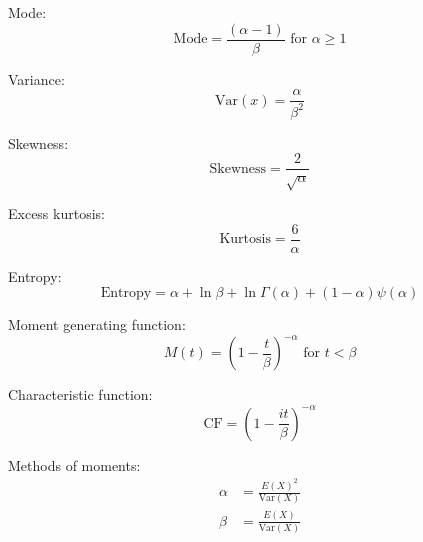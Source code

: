 \documentclass[12pt]{article}
\begin{document}
Mode:
\begin{equation}\label{eq:gamma-mode-2}
	\text{Mode} = \frac{(\alpha-1)}{\beta}\text{ for }\alpha \geq 1
\end{equation}

Variance:
\begin{equation}\label{eq:gamma-variance-2}
	\text{Var}(x) = \frac{\alpha}{\beta^2}
\end{equation}

Skewness:
\begin{equation}\label{eq:gamma-skewness-2}
	\text{Skewness} = \frac{2}{\sqrt{\alpha}}
\end{equation}

Excess kurtosis:
\begin{equation}\label{eq:gamma-kurtosis-2}
	\text{Kurtosis} = \frac{6}{\alpha}
\end{equation}

Entropy:
\begin{equation}\label{eq:gamma-entropy-2}
	\text{Entropy} = \alpha + \ln{\beta} + \ln{\Gamma(\alpha)} + (1-\alpha)\psi(\alpha)
\end{equation}

Moment generating function:
\begin{equation}\label{eq:gamma-mgf-2}
	M(t) = \left(1-\frac{t}{\beta}\right)^{-\alpha}\text{ for }t < \beta
\end{equation}

Characteristic function:
\begin{equation}\label{eq:gamma-cf-2}
	\text{CF} = \left(1-\frac{it}{\beta}\right)^{-\alpha}
\end{equation}

Methods of moments:
\begin{equation}\label{eq:gamma-mom-2}
	\begin{split}
		\alpha	&=	\frac{E(X)^2}{\text{Var}(X)}\\
		\beta	&=	\frac{E(X)}{\text{Var}(X)}
	\end{split}
\end{equation}

\pagebreak

\begin{appendix}
	\listoffigures
	\listoftables
\end{appendix}

\pagebreak{}\printbibliography[heading=bibintoc,title={References}]
\end{document}
